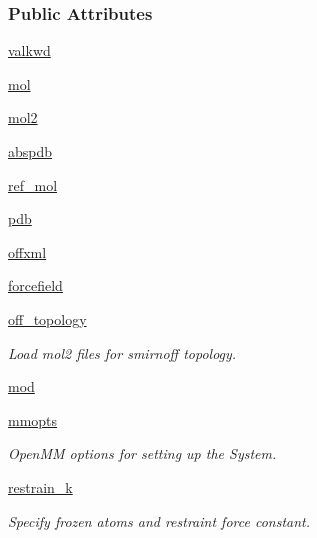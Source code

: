 \subsubsection*{Public Attributes}
\begin{DoxyCompactItemize}
\item 
\hyperlink{classsrc_1_1smirnoffio_1_1SMIRNOFF_a512326b17c315ad466f59b0c85f7b686}{valkwd}
\item 
\hyperlink{classsrc_1_1smirnoffio_1_1SMIRNOFF_a3eef2c258d9d92b6440192fbb5c74975}{mol}
\item 
\hyperlink{classsrc_1_1smirnoffio_1_1SMIRNOFF_a4997efa6f2926b3d4c267f3cc0ca295a}{mol2}
\item 
\hyperlink{classsrc_1_1smirnoffio_1_1SMIRNOFF_a0938e9434777f90456058d4371a04460}{abspdb}
\item 
\hyperlink{classsrc_1_1smirnoffio_1_1SMIRNOFF_aa094e87c94b86e457af67837acceff85}{ref\+\_\+mol}
\item 
\hyperlink{classsrc_1_1smirnoffio_1_1SMIRNOFF_ac503aa0501017274fcc6a4b9acf9f065}{pdb}
\item 
\hyperlink{classsrc_1_1smirnoffio_1_1SMIRNOFF_af990e39412c8a1cee1badc6be35e28cb}{offxml}
\item 
\hyperlink{classsrc_1_1smirnoffio_1_1SMIRNOFF_a09780bd53ef235921d497194a4a86e51}{forcefield}
\item 
\hyperlink{classsrc_1_1smirnoffio_1_1SMIRNOFF_a861db9f0c2b1c000b7c74363eef1a643}{off\+\_\+topology}
\begin{DoxyCompactList}\small\item\em Load mol2 files for smirnoff topology. \end{DoxyCompactList}\item 
\hyperlink{classsrc_1_1smirnoffio_1_1SMIRNOFF_a06280a367037b587147b2883404c6f00}{mod}
\item 
\hyperlink{classsrc_1_1smirnoffio_1_1SMIRNOFF_ac24dace8bbb369246c19f85dfc4b5b92}{mmopts}
\begin{DoxyCompactList}\small\item\em Open\+MM options for setting up the System. \end{DoxyCompactList}\item 
\hyperlink{classsrc_1_1smirnoffio_1_1SMIRNOFF_ab6dbfd45c6f21672599ccd962460e133}{restrain\+\_\+k}
\begin{DoxyCompactList}\small\item\em Specify frozen atoms and restraint force constant. \end{DoxyCompactList}\item 

\end{DoxyCompactItemize}
